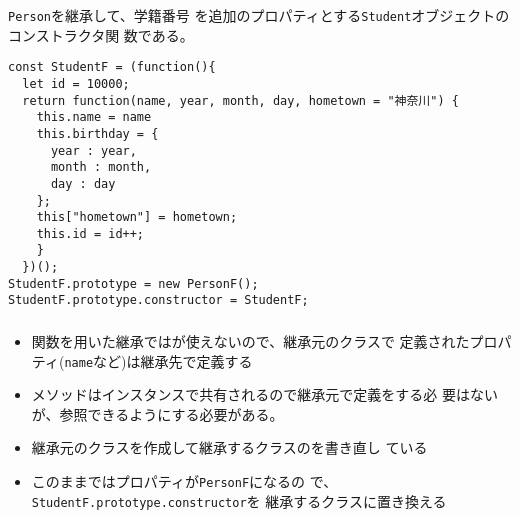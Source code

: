 \begin{frame}[containsverbatim]
\begin{frame}[containsverbatim]
 \texttt{Person}を継承して、学籍番号
 を追加のプロパティとする\texttt{Student}オブジェクトのコンストラクタ関
 数である。
\begin{Verbatim}
const StudentF = (function(){
  let id = 10000;
  return function(name, year, month, day, hometown = "神奈川") {
    this.name = name
    this.birthday = {
      year : year,
      month : month,
      day : day
    };
    this["hometown"] = hometown;
    this.id = id++;
    }
  })();
StudentF.prototype = new PersonF();
StudentF.prototype.constructor = StudentF;
\end{Verbatim}
\end{frame}
\begin{frame}[containsverbatim]
 \frametitle{}
 \begin{itemize}
 \item 関数を用いた継承ではが使えないので、継承元のクラスで
       定義されたプロパティ(\texttt{name}など)は継承先で定義する
 \item メソッドはインスタンスで共有されるので継承元で定義をする必
       要はないが、参照できるようにする必要がある。
  \item 継承元のクラスを作成して継承するクラスのを書き直し
       ている
 \item このままではプロパティが\texttt{PersonF}になるの
       で、\texttt{StudentF.prototype.constructor}を
       継承するクラスに置き換える
\end{itemize}
\end{frame}

\end{frame}
